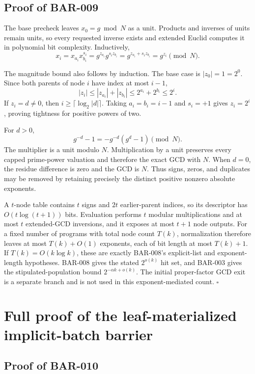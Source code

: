 \documentclass[11pt]{article}
\begin{document}
\subsection{Proof of BAR-009}\label{proof:BAR-009}

The base precheck leaves \(x_0=g\bmod N\) as a unit. Products and inverses of
units remain units, so every requested inverse exists and extended Euclid
computes it in polynomial bit complexity. Inductively,
\[
x_i=x_{a_i}x_{b_i}^{s_i}
=g^{z_{a_i}}g^{s_i z_{b_i}}
=g^{z_{a_i}+s_i z_{b_i}}
=g^{z_i}\pmod N.
\tag{27}
\]

The magnitude bound also follows by induction. The base case is
\(|z_0|=1=2^0\). Since both parents of node \(i\) have index at most \(i-1\),
\[
|z_i|
\le |z_{a_i}|+|z_{b_i}|
\le2^{a_i}+2^{b_i}
\le2^i.
\tag{28}
\]
If \(z_i=d\ne0\), then \(i\ge\lceil\log_2|d|\rceil\). Taking
\(a_i=b_i=i-1\) and \(s_i=+1\) gives \(z_i=2^i\), proving tightness for
positive powers of two.

For \(d>0\),
\[
g^{-d}-1=-g^{-d}(g^d-1)\pmod N.
\tag{29}
\]
The multiplier is a unit modulo \(N\). Multiplication by a unit preserves
every capped prime-power valuation and therefore the exact GCD with \(N\).
When \(d=0\), the residue difference is zero and the GCD is \(N\). Thus signs,
zeros, and duplicates may be removed by retaining precisely the distinct
positive nonzero absolute exponents.

A \(t\)-node table contains \(t\) signs and \(2t\) earlier-parent indices, so
its descriptor has \(O(t\log(t+1))\) bits. Evaluation performs \(t\) modular
multiplications and at most \(t\) extended-GCD inversions, and it exposes at
most \(t+1\) node outputs. For a fixed number of programs with total node
count \(T(k)\), normalization therefore leaves at most \(T(k)+O(1)\)
exponents, each of bit length at most \(T(k)+1\). If
\(T(k)=O(k\log k)\), these are exactly BAR-008's explicit-list and
exponent-length hypotheses. BAR-008 gives the stated \(2^{o(k)}\) hit set,
and BAR-003 gives the stipulated-population bound
\(2^{-\alpha k+o(k)}\). The initial proper-factor GCD exit is a separate
branch and is not used in this exponent-mediated count. \(\square\)

\section{Full proof of the leaf-materialized implicit-batch barrier}

\subsection{Proof of BAR-010}\label{proof:BAR-010}
\end{document}
